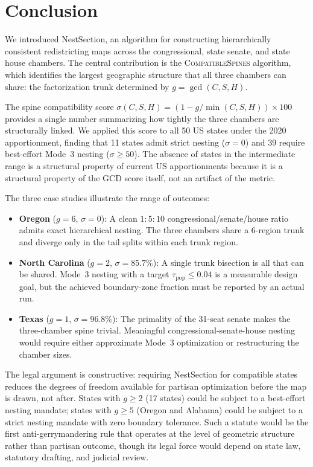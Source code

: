 \section{Conclusion}
\label{sec:conclusion}

We introduced NestSection, an algorithm for constructing hierarchically
consistent redistricting maps across the congressional, state senate, and state
house chambers.  The central contribution is the \textsc{CompatibleSpines}
algorithm, which identifies the largest geographic structure that all three
chambers can share: the factorization trunk determined by $g = \gcd(C, S, H)$.

The spine compatibility score $\sigma(C, S, H) = (1 - g/\min(C,S,H)) \times 100$
provides a single number summarizing how tightly the three chambers are
structurally linked.  We applied this score to all 50 US states under the 2020
apportionment, finding that 11 states admit strict nesting ($\sigma = 0$) and
39 require best-effort Mode~3 nesting ($\sigma \geq 50$).  The absence of
states in the intermediate range is a structural property of current US
apportionments because it is a structural property of the GCD score itself,
not an artifact of the metric.

The three case studies illustrate the range of outcomes:
\begin{itemize}
  \item \textbf{Oregon} ($g = 6$, $\sigma = 0$): A clean $1:5:10$
        congressional/senate/house ratio admits exact hierarchical nesting.
        The three chambers share a 6-region trunk and diverge only in the
        tail splits within each trunk region.
  \item \textbf{North Carolina} ($g = 2$, $\sigma = 85.7\%$): A single trunk
        bisection is all that can be shared.  Mode~3 nesting with
        a target $\tau_\text{pop} \leq 0.04$ is a measurable design goal, but
        the achieved boundary-zone fraction must be reported by an actual run.
  \item \textbf{Texas} ($g = 1$, $\sigma = 96.8\%$): The primality of the
        31-seat senate makes the three-chamber spine trivial.  Meaningful
        congressional-senate-house nesting would require either approximate
        Mode~3 optimization or restructuring the chamber sizes.
\end{itemize}

The legal argument is constructive: requiring NestSection for compatible states
reduces the degrees of freedom available for partisan optimization before the
map is drawn, not after.  States with $g \geq 2$ (17 states) could be subject
to a best-effort nesting mandate; states with $g \geq 5$ (Oregon and Alabama)
could be subject to a strict nesting mandate with zero boundary tolerance.
Such a statute would be the first anti-gerrymandering rule that operates at
the level of geometric structure rather than partisan outcome, though its legal
force would depend on state law, statutory drafting, and judicial review.

